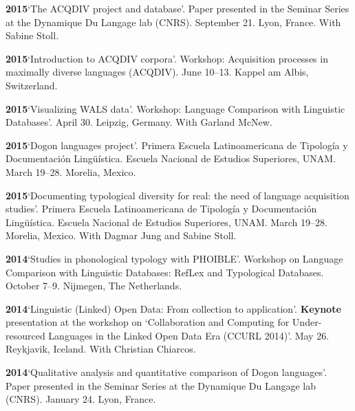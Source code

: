\documentclass[11pt]{article}
\newcommand{\hangpara}{
 \setlength{\parindent}{0in} %
 \hangindent=0.42in %
}
\begin{document}
\vskip 6pt
\hangpara
{\bf 2015}\hspace{1ex}`The ACQDIV project and database'. Paper presented in the Seminar Series at the Dynamique Du Langage lab (CNRS). September 21. Lyon, France. With Sabine Stoll.

\vskip 6pt
\hangpara
{\bf 2015}\hspace{1ex}`Introduction to ACQDIV corpora'. Workshop: Acquisition processes in maximally diverse languages (ACQDIV). June 10--13. Kappel am Albis, Switzerland.

\vskip 6pt
\hangpara
{\bf 2015}\hspace{1ex}`Visualizing WALS data'. Workshop: Language Comparison with Linguistic Databases'. April 30. Leipzig, Germany. With Garland McNew.

\vskip 6pt
\hangpara
{\bf 2015}\hspace{1ex}`Dogon languages project'. Primera Escuela Latinoamericana de Tipolog{\'i}a y Documentaci{\'o}n Ling{\"u}{\'i}stica. Escuela Nacional de Estudios Superiores, UNAM. March 19--28. Morelia, Mexico.

\vskip 6pt
\hangpara
{\bf 2015}\hspace{1ex}`Documenting typological diversity for real: the need of language acquisition studies'.  Primera Escuela Latinoamericana de Tipolog{\'i}a y Documentaci{\'o}n Ling{\"u}{\'i}stica. Escuela Nacional de Estudios Superiores, UNAM. March 19--28. Morelia, Mexico. With Dagmar Jung and Sabine Stoll.

\vskip 6pt
\hangpara
{\bf 2014}\hspace{1ex}`Studies in phonological typology with PHOIBLE'. Workshop on Language Comparison with Linguistic Databases: RefLex and Typological Databases. October 7--9. Nijmegen, The Netherlands.

\vskip 6pt
\hangpara
{\bf 2014}\hspace{1ex}`Linguistic (Linked) Open Data: From collection to application'. \textbf{Keynote} presentation at the workshop on `Collaboration and Computing for Under-resourced Languages in the Linked Open Data Era (CCURL 2014)'. May 26. Reykjavik, Iceland. With Christian Chiarcos.

\vskip 6pt
\hangpara
{\bf 2014}\hspace{1ex}`Qualitative analysis and quantitative comparison of Dogon languages'. Paper presented in the Seminar Series at the Dynamique Du Langage lab (CNRS). January 24. Lyon, France.
\end{document}
